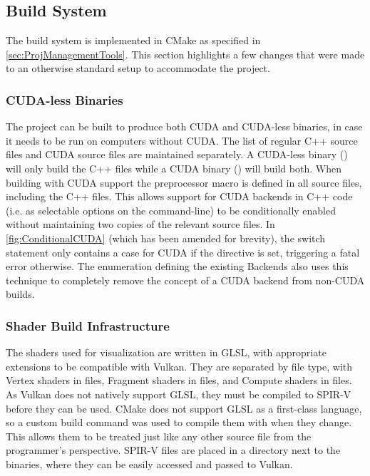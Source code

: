 \subsection{Build System}
The build system is implemented in CMake as specified in \cref{sec:ProjManagementTools}. %
This section highlights a few changes that were made to an otherwise standard setup to accommodate the project.

\subsubsection{CUDA-less Binaries}
The project can be built to produce both CUDA and CUDA-less binaries, in case it needs to be run on computers without CUDA.
The list of regular C++ source files and CUDA source files are maintained separately. A CUDA-less binary () will only build the C++ files while a CUDA binary () will build both.
When building with CUDA support the preprocessor macro  is defined in all source files, including the C++ files.
This allows support for CUDA backends in C++ code (i.e. as selectable options on the command-line) to be conditionally enabled without maintaining two copies of the relevant source files.
In \cref{fig:ConditionalCUDA} (which has been amended for brevity), the switch statement only contains a case for CUDA if the directive is set, triggering a fatal error otherwise.
The enumeration defining the existing Backends also uses this technique to completely remove the concept of a CUDA backend from non-CUDA builds.



\subsubsection{Shader Build Infrastructure} %
The shaders used for visualization are written in GLSL, with appropriate extensions to be compatible with Vulkan.
They are separated by file type, with Vertex shaders in  files, Fragment shaders in  files, and Compute shaders in  files.
As Vulkan does not natively support GLSL, they must be compiled to SPIR-V before they can be used.
CMake does not support GLSL as a first-class language, so a custom build command was used to compile them with \cite{GoogleLLCShaderc} when they change.
This allows them to be treated just like any other source file from the programmer's perspective.
SPIR-V files are placed in a  directory next to the binaries, where they can be easily accessed and passed to Vulkan.